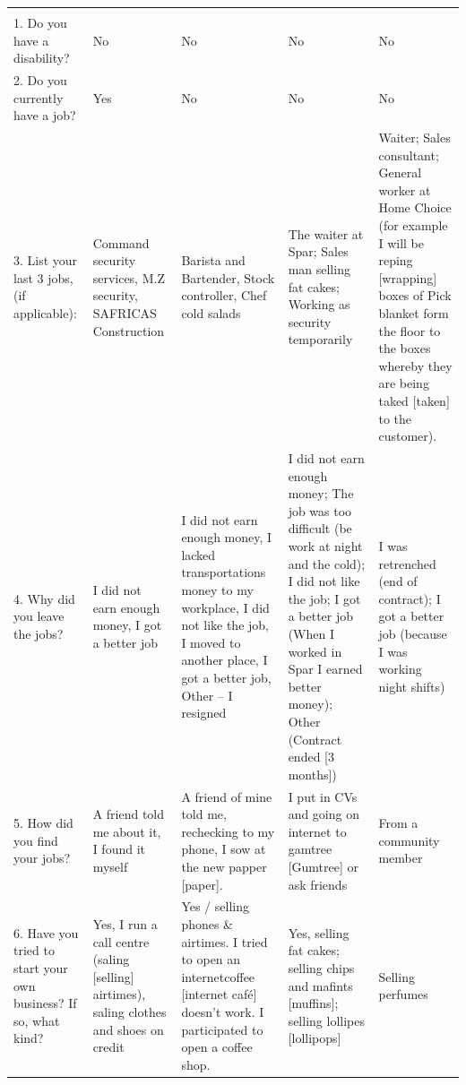 \begin{longtable}{
|>{\RaggedRight\arraybackslash}p{3cm}|
>{\RaggedRight\arraybackslash}p{2.7cm}|
>{\RaggedRight\arraybackslash}p{2.7cm}|
>{\RaggedRight\arraybackslash}p{2.7cm}|
>{\RaggedRight\arraybackslash}p{2.7cm}|
}
\hline
\multicolumn{5}{|l|}{\textbf{Part 2: Understanding Participants and the Unemployment Problem}} \\
\hline
\rowcolor{gray!15}
\multicolumn{1}{|c}{\textbf{Question}} & 
\multicolumn{2}{|c|}{\textbf{The Zanokhanyo Network}} & 
\multicolumn{2}{c|}{\textbf{Afrika Tikkun}} \\
\hline

1. Do you have a disability? 
& No 
& No 
& No 
& No \\
\hline

2. Do you currently have a job? 
& Yes 
& No 
& No 
& No \\
\hline

3. List your last 3 jobs, (if applicable):  
& Command security services, M.Z security, SAFRICAS Construction 
& Barista and Bartender, Stock controller, Chef cold salads  
& The waiter at Spar; Sales man selling fat cakes; Working as security temporarily 
& Waiter; Sales consultant; General worker at Home Choice (for example I will be reping [wrapping] boxes of Pick blanket form the floor to the boxes whereby they are being taked [taken] to the customer). \\
\hline

4. Why did you leave the jobs?  
& I did not earn enough money, I got a better job 
& I did not earn enough money, I lacked transportations money to my workplace, I did not like the job, I moved to another place, I got a better job, Other – I resigned 
& I did not earn enough money; The job was too difficult (be work at night and the cold); I did not like the job; I got a better job (When I worked in Spar I earned better money); Other (Contract ended [3 months]) 
& I was retrenched (end of contract); I got a better job (because I was working night shifts) \\
\hline

5. How did you find your jobs?  
& A friend told me about it, I found it myself 
& A friend of mine told me, rechecking to my phone, I sow at the new papper [paper]. 
& I put in CVs and going on internet to gamtree [Gumtree] or ask friends 
& From a community member \\
\hline

6. Have you tried to start your own business? If so, what kind? 
& Yes, I run a call centre (saling [selling] airtimes), saling clothes and shoes on credit 
& Yes / selling phones \& airtimes. I tried to open an internetcoffee [internet café] doesn’t work. I participated to open a coffee shop.  
& Yes, selling fat cakes; selling chips and mafints [muffins]; selling lollipes [lollipops] 
& Selling perfumes \\
\hline


\end{longtable}

